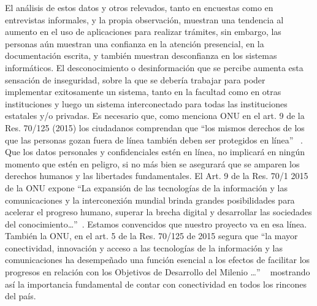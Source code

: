 \documentclass[a4paper]{article}
\begin{document}
El análisis de estos datos y otros relevados, tanto en encuestas como en entrevistas informales, y la propia observación, muestran una tendencia al aumento en el uso de aplicaciones para realizar trámites, sin embargo, las personas aún muestran una confianza en la atención presencial, en la documentación escrita, y también muestran desconfianza en los sistemas informáticos. El desconocimiento o desinformación que se percibe aumenta esta sensación de inseguridad, sobre la que se debería trabajar para poder implementar exitosamente un sistema, tanto en la facultad como en otras instituciones y luego un sistema interconectado para todas las instituciones estatales y/o privadas. Es necesario que, como menciona ONU en el art. 9 de la Res. 70/125 (2015) los ciudadanos comprendan que “los mismos derechos de los que las personas gozan fuera de línea también deben ser protegidos en línea” ~\cite{onu15}. Que los datos personales y confidenciales estén en línea, no implicará en ningún momento que estén en peligro, si no más bien se asegurará que se amparen los derechos humanos y las libertades fundamentales. 
El Art. 9 de la Res. 70/1 2015 de la ONU expone “La expansión de las tecnologías de la información y las comunicaciones y la interconexión mundial brinda grandes posibilidades para acelerar el progreso humano, superar la brecha digital y desarrollar las sociedades del conocimiento…”~\cite{onu15}. Estamos convencidos que nuestro proyecto va en esa línea. 
También la ONU, en el art. 5 de la Res. 70/125  de 2015 segura que “la mayor conectividad, innovación y acceso a las tecnologías de la información y las comunicaciones ha desempeñado una función esencial a los efectos de facilitar los progresos en relación con los Objetivos de Desarrollo del Milenio …” ~\cite{onu15} mostrando así la importancia fundamental de contar con conectividad en todos los rincones del país. 

\printbibliography
\end{document}
